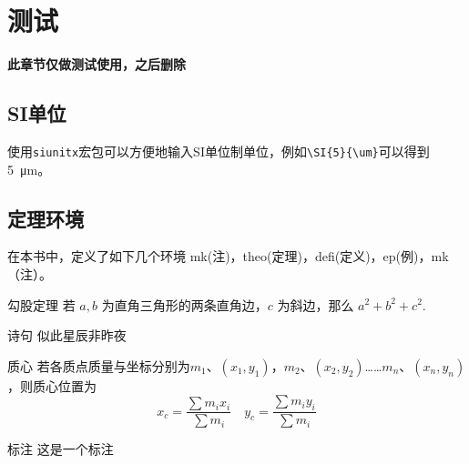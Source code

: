 \documentclass{gbook}
\begin{document}
\newpage


\setcounter{page}{1}

\tableofcontents

\newpage

\setcounter{page}{1}










\chapter{测试}

\textbf{此章节仅做测试使用，之后删除}

\section{SI单位}

使用\verb+siunitx+宏包可以方便地输入SI单位制单位，例如\verb+\SI{5}{\um}+可以得到\SI{5}{\um}。

\section{定理环境}

在本书中，定义了如下几个环境
mk(注)，theo(定理)，defi(定义)，ep(例)，mk（注）。

\begin{theo}{勾股定理}{}
若 $a,b$ 为直角三角形的两条直角边，$c$ 为斜边，那么 $a^2 + b^2 + c^2.$
\end{theo}

\begin{ep}{诗句}{}
似此星辰非昨夜
\end{ep}

\begin{defi}{质心}{}
若各质点质量与坐标分别为$m_1$、$(x_1,y_1)$，$m_2$、$(x_2,y_2)$……$m_n$、$(x_n,y_n)$，则质心位置为
$$x_c = \frac{\sum m_i x_i}{\sum m_i} \quad y_c = \frac{\sum m_i y_i}{\sum m_i}$$
\end{defi}

\begin{mk}{标注}{}
这是一个标注
\end{mk}
\end{document}

